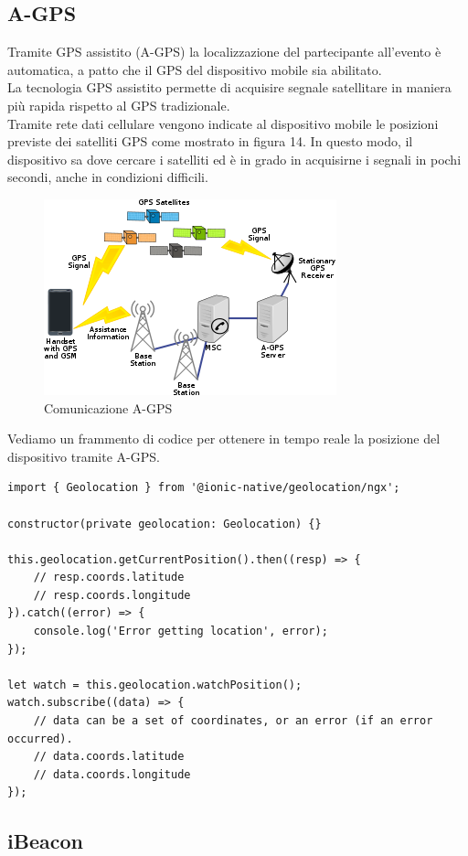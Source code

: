 \subsection{A-GPS}

Tramite GPS assistito (A-GPS) la localizzazione del partecipante all'evento è automatica,
a patto che il GPS del dispositivo mobile sia abilitato.\\
La tecnologia GPS assistito permette di acquisire segnale satellitare in maniera più rapida
rispetto al GPS tradizionale.\\
Tramite rete dati cellulare vengono indicate al dispositivo mobile le posizioni previste dei
satelliti GPS come mostrato in figura 14. In questo modo, il dispositivo sa dove cercare i satelliti ed è in grado in acquisirne 
i segnali in pochi secondi, anche in condizioni difficili.
\begin{figure}[H]
    \centering  
    \caption{Comunicazione A-GPS}
    \includegraphics[scale=0.7]{img/cap2/gps}
\end{figure}
Vediamo un frammento di codice per ottenere in tempo reale la 
posizione del dispositivo tramite A-GPS.
\begin{lstlisting}
import { Geolocation } from '@ionic-native/geolocation/ngx';

constructor(private geolocation: Geolocation) {}

this.geolocation.getCurrentPosition().then((resp) => {
    // resp.coords.latitude
    // resp.coords.longitude
}).catch((error) => {
    console.log('Error getting location', error);
});

let watch = this.geolocation.watchPosition();
watch.subscribe((data) => {
    // data can be a set of coordinates, or an error (if an error occurred).
    // data.coords.latitude
    // data.coords.longitude
});
\end{lstlisting}

\subsection{iBeacon}


